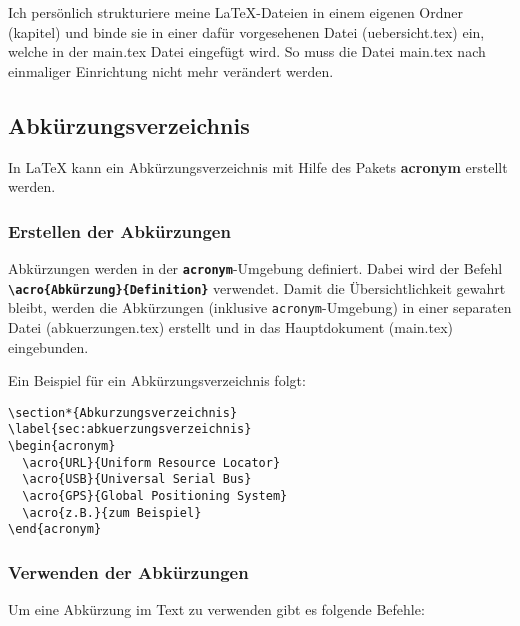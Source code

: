 Ich persönlich strukturiere meine \LaTeX{}-Dateien in einem eigenen Ordner (kapitel) und binde sie in einer dafür vorgesehenen Datei (uebersicht.tex) ein, welche in der main.tex Datei eingefügt wird. So muss die Datei main.tex nach einmaliger Einrichtung nicht mehr verändert werden.


\subsection{Abkürzungsverzeichnis}
\label{sec:abkuerzungsverzeichnis_erklärung}
In \LaTeX{} kann ein Abkürzungsverzeichnis mit Hilfe des Pakets \textbf{acronym} erstellt werden.

\subsubsection{Erstellen der Abkürzungen}
Abkürzungen werden in der \texttt{\textbf{acronym}}-Umgebung definiert. Dabei wird der Befehl \newline \textbf{\texttt{\textbackslash acro\{Abkürzung\}\{Definition\}}} verwendet.
Damit die Übersichtlichkeit gewahrt bleibt, werden die Abkürzungen (inklusive \texttt{acronym}-Umgebung) in einer separaten Datei (abkuerzungen.tex) erstellt und in das Hauptdokument (main.tex) eingebunden.

Ein Beispiel für ein Abkürzungsverzeichnis folgt:

\begin{lstlisting}[language={[LaTeX]TeX}]
\section*{Abkurzungsverzeichnis}
\label{sec:abkuerzungsverzeichnis}
\begin{acronym}
  \acro{URL}{Uniform Resource Locator}
  \acro{USB}{Universal Serial Bus}
  \acro{GPS}{Global Positioning System}
  \acro{z.B.}{zum Beispiel}
\end{acronym}
\end{lstlisting}


\subsubsection{Verwenden der Abkürzungen}
Um eine Abkürzung im Text zu verwenden gibt es folgende Befehle:

